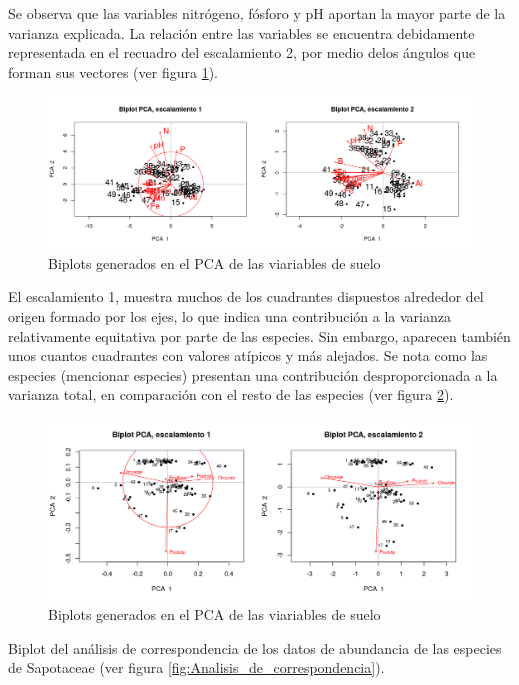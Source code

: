 \documentclass[11pt,]{article}
\begin{document}
Se observa que las variables nitrógeno, fósforo y pH aportan la mayor
parte de la varianza explicada. La relación entre las variables se
encuentra debidamente representada en el recuadro del escalamiento 2,
por medio delos ángulos que forman sus vectores (ver figura
\ref{fig:Biplot_PCA_escalamiento}).

\begin{figure}
\centering
\includegraphics[width=1.00000\textwidth]{Biplot_PCA_escalamiento_actualizado.png}
\caption{Biplots generados en el PCA de las viariables de suelo
\label{fig:Biplot_PCA_escalamiento}}
\end{figure}

El escalamiento 1, muestra muchos de los cuadrantes dispuestos alrededor
del origen formado por los ejes, lo que indica una contribución a la
varianza relativamente equitativa por parte de las especies. Sin
embargo, aparecen también unos cuantos cuadrantes con valores atípicos y
más alejados. Se nota como las especies (mencionar especies) presentan
una contribución desproporcionada a la varianza total, en comparación
con el resto de las especies (ver figura \ref{fig:PCA_comunidad}).

\begin{figure}
\centering
\includegraphics[width=1.00000\textwidth]{PCA_comunidad_actualizado.png}
\caption{Biplots generados en el PCA de las viariables de suelo
\label{fig:PCA_comunidad}}
\end{figure}

Biplot del análisis de correspondencia de los datos de abundancia de las
especies de Sapotaceae (ver figura
\ref{fig:Analisis_de_correspondencia}).
\end{document}
